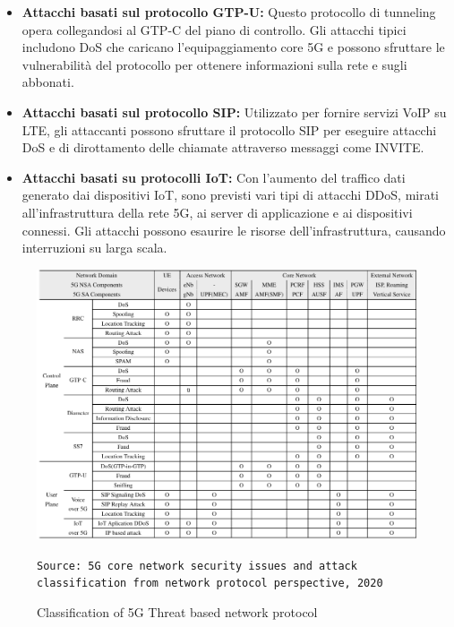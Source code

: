 \documentclass[english]{article}
\begin{document}
\begin{itemize}
	\item \textbf{Attacchi basati sul protocollo GTP-U:} Questo protocollo di tunneling opera collegandosi al GTP-C del piano di controllo. Gli attacchi tipici includono DoS che caricano l'equipaggiamento core 5G e possono sfruttare le vulnerabilità del protocollo per ottenere informazioni sulla rete e sugli abbonati.

	\item \textbf{Attacchi basati sul protocollo SIP:} Utilizzato per fornire servizi VoIP su LTE, gli attaccanti possono sfruttare il protocollo SIP per eseguire attacchi DoS e di dirottamento delle chiamate attraverso messaggi come INVITE.\@

	\item \textbf{Attacchi basati su protocolli IoT:} Con l'aumento del traffico dati generato dai dispositivi IoT, sono previsti vari tipi di attacchi DDoS, mirati all'infrastruttura della rete 5G, ai server di applicazione e ai dispositivi connessi. Gli attacchi possono esaurire le risorse dell'infrastruttura, causando interruzioni su larga scala.
\end{itemize}

\begin{figure}[h]
	\centering
	\includegraphics[width=\textwidth]{ATTACCHI.png}
	\caption{Classification of 5G Threat based network protocol}\label{fig:attacco}
	\texttt{Source: 5G core network security issues and attack classification from
		network protocol perspective, 2020}
\end{figure}

\end{document}
